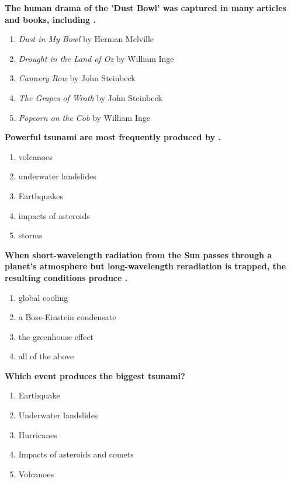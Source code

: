 \item {
\setlength{\itemsep}{0cm}
\setlength{\parskip}{.2cm}
\begin{samepage}
\textbf{
The human drama of the 'Dust Bowl' was captured in many articles and books, including \makebox[1cm]{\Rivpt\hrulefill\Rivpt}.
}
\begin{enumerate}
\item {  \emph{Dust in My Bowl} by Herman Melville  }
\item {  \emph{Drought in the Land of Oz} by William Inge }
\item {  \emph{Cannery Row} by John Steinbeck  }
\item {  \emph{The Grapes of Wrath} by John Steinbeck  }
\item {  \emph{Popcorn on the Cob} by William Inge }
\end{enumerate}
\end{samepage}
}
\item {
\setlength{\itemsep}{0cm}
\setlength{\parskip}{.2cm}
\begin{samepage}
\textbf{
Powerful tsunami are most frequently produced by \makebox[1cm]{\Rivpt\hrulefill\Rivpt}.
}
\begin{enumerate}
\item { 	volcanoes }
\item { 	underwater landslides }
\item { 	Earthquakes }
\item { 	impacts of asteroids }
\item { 	storms 		 }
\end{enumerate}
\end{samepage}
}
\item {
\setlength{\itemsep}{0cm}
\setlength{\parskip}{.2cm}
\begin{samepage}
\textbf{
When short-wavelength radiation from the Sun passes through a planet's atmosphere but long-wavelength reradiation is trapped, the resulting conditions produce \makebox[1cm]{\Rivpt\hrulefill\Rivpt}.
}
\begin{enumerate}
\item {  global cooling }
\item {  a Bose-Einstein condensate }
\item {  the greenhouse effect  }
\item {  all of the above }
\end{enumerate}
\end{samepage}
}
\item {
\setlength{\itemsep}{0cm}
\setlength{\parskip}{.2cm}
\begin{samepage}
\textbf{
Which event produces the biggest tsunami?
}
\begin{enumerate}
\item { 	Earthquake }
\item { 	Underwater landslides }
\item { 	Hurricanes }
\item { 	Impacts of asteroids and comets }
\item { 	Volcanoes 		 }
\end{enumerate}
\end{samepage}
}
